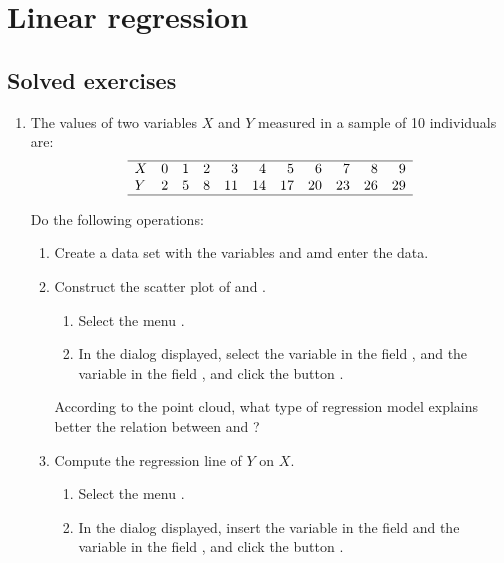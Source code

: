 
\chapter{Linear regression}\label{cha:linear-regression}

\section{Solved exercises}
\begin{enumerate}[leftmargin=*]
\item The values of two variables $X$ and $Y$ measured in a sample of 10 individuals are:
\[
\begin{array}{lrrrrrrrrrr}
\hline
X & 0 & 1 & 2 & 3 & 4 & 5 & 6 & 7 & 8 & 9 \\
Y & 2 & 5 & 8 & 11 & 14 & 17 & 20 & 23 & 26 & 29\\
\hline
\end{array}
\]

Do the following operations:

\begin{enumerate}
\item Create a data set with the variables  and  amd enter the data.
\item Construct the scatter plot of  and .
\begin{indication}
\begin{enumerate}
\item Select the menu .
\item In the dialog displayed, select the variable  in the field , and the variable
 in the field , and click the button .
\end{enumerate}
\end{indication}

According to the point cloud, what type of regression model explains better the relation between  and
?

\item Compute the regression line of $Y$ on $X$.
\begin{indication}
\begin{enumerate}
\item Select the menu .
\item In the dialog displayed, insert the variable  in the field  and the variable
 in the field , and click the button .
\end{enumerate}
\end{indication}


\end{enumerate}
\end{enumerate}
